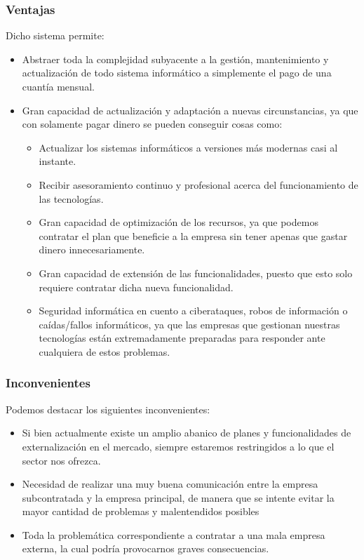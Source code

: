 \documentclass[12pt,letterpaper]{article}
\begin{document}
			\subsubsection{Ventajas} 
	Dicho sistema permite:
				\begin{itemize}  
					\item Abstraer toda la complejidad subyacente a la gestión, mantenimiento y actualización de todo sistema informático a simplemente el pago de una cuantía mensual.
					\item Gran capacidad de actualización y adaptación a nuevas circunstancias, ya que con solamente pagar dinero se pueden conseguir cosas como:
					\begin{itemize}  
						\item Actualizar los sistemas informáticos a versiones más modernas casi al instante.
						\item Recibir asesoramiento continuo y profesional acerca del funcionamiento de las tecnologías.
						\item Gran capacidad de optimización de los recursos, ya que podemos contratar el plan que beneficie a la empresa sin tener apenas que gastar dinero innecesariamente.
						\item Gran capacidad de extensión de las funcionalidades, puesto que esto solo requiere contratar dicha nueva funcionalidad.
						\item Seguridad informática en cuento a ciberataques, robos de información o caídas/fallos informáticos, ya que las empresas que gestionan nuestras tecnologías están extremadamente preparadas para responder ante cualquiera de estos problemas.
	
					\end{itemize}
				\end{itemize}
	
			\subsubsection{Inconvenientes}
	Podemos destacar los siguientes inconvenientes:
				\begin{itemize}  
					\item Si bien actualmente existe un amplio abanico de planes y funcionalidades de externalización en el mercado, siempre estaremos restringidos a lo que el sector nos ofrezca.
					\item Necesidad de realizar una muy buena comunicación entre la empresa subcontratada y la empresa principal, de manera que se intente evitar la mayor cantidad de problemas y malentendidos posibles
					\item Toda la problemática correspondiente a contratar a una mala empresa externa, la cual podría provocarnos graves consecuencias.
				\end{itemize}
	
\end{document}

